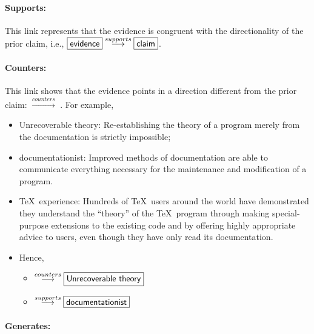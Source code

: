 \paragraph{Supports:}

This link represents that the evidence is congruent with the directionality
of the prior claim, i.e., \( \fbox{{\sf evidence}}
\stackrel{supports}{\longrightarrow} \fbox{{\sf claim}} \).

\paragraph{Counters:}

This link shows that the evidence points in a direction different from the
prior claim:  \( \stackrel{counters}{\longrightarrow}
\) .  For example,

\small
\begin{itemize}
\item {\sf Unrecoverable theory}: Re-establishing the theory of a program
  merely from the documentation is strictly impossible;
  
\item {\sf documentationist}: Improved methods of documentation are
  able to communicate everything necessary for the maintenance and
  modification of a program.
  
\item {\sf \TeX\ experience:} Hundreds of \TeX\ users around the world have
  demonstrated they understand the ``theory'' of the \TeX\ program through
  making special-purpose extensions to the existing code and by offering
  highly appropriate advice to users, even though they have only read its
  documentation.
  
\item Hence,
  \begin{itemize}
  \item {}
  \( \stackrel{counters}{\longrightarrow} \fbox{{\sf Unrecoverable theory}} \) \\
  
\item {}
  \( \stackrel{supports}{\longrightarrow} \fbox{{\sf documentationist}} \)
  \end{itemize}
\end{itemize}
\normalsize

\paragraph{Generates:}

